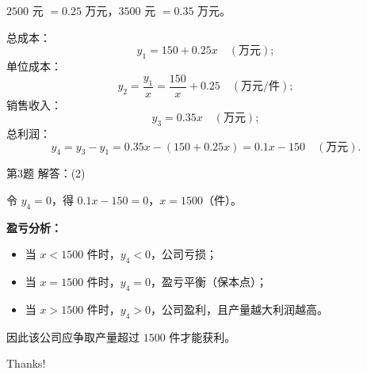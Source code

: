 \documentclass[10pt,aspectratio=169,serif,fleqn]{beamer}
\begin{document}
\begin{frame}[t]
	\vspace{-2em}
\begin{tcolorbox}[colback=orange!10,colframe=orange,title=\textbf{解：(1)}]
$2500$ 元 $=0.25$ 万元，$3500$ 元 $=0.35$ 万元。

\vspace{0.3em}
总成本：
\[
y_1=150+0.25x\quad (\text{万元});
\]
单位成本：
\[
y_2=\frac{y_1}{x}=\frac{150}{x}+0.25\quad (\text{万元/件});
\]
销售收入：
\[
y_3=0.35x\quad (\text{万元});
\]
总利润：
\[
y_4=y_3-y_1=0.35x-(150+0.25x)=0.1x-150\quad (\text{万元}).
\]
\end{tcolorbox}
\end{frame}

\begin{frame}[t]{第3题 解答：(2)}
\begin{tcolorbox}[colback=orange!10,colframe=orange,title=\textbf{解：(2)}]
令 $y_4=0$，得 $0.1x-150=0$，$x=1500$（件）。

\vspace{0.5em}
\textbf{盈亏分析：}
\begin{itemize}
  \item 当 $x<1500$ 件时，$y_4<0$，公司亏损；
  \item 当 $x=1500$ 件时，$y_4=0$，盈亏平衡（保本点）；
  \item 当 $x>1500$ 件时，$y_4>0$，公司盈利，且产量越大利润越高。
\end{itemize}

\vspace{0.5em}
因此该公司应争取产量超过 $1500$ 件才能获利。
\end{tcolorbox}
\end{frame}

\begin{frame}[c]
  \begin{center}
    {\Huge\calligra Thanks!}
  \end{center}
\end{frame}
\end{document}
